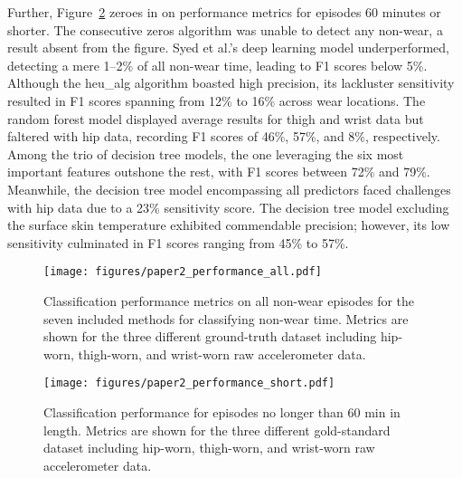 \documentclass[
  10pt,
]{scrbook}
\begin{document}
Further, Figure~\ref{fig-paper2_performance_short} zeroes in on
performance metrics for episodes 60 minutes or shorter. The consecutive
zeros algorithm was unable to detect any non-wear, a result absent from
the figure. Syed et al.'s deep learning model underperformed, detecting
a mere 1--2\% of all non-wear time, leading to F1 scores below 5\%.
Although the heu\_alg algorithm boasted high precision, its lackluster
sensitivity resulted in F1 scores spanning from 12\% to 16\% across wear
locations. The random forest model displayed average results for thigh
and wrist data but faltered with hip data, recording F1 scores of 46\%,
57\%, and 8\%, respectively. Among the trio of decision tree models, the
one leveraging the six most important features outshone the rest, with
F1 scores between 72\% and 79\%. Meanwhile, the decision tree model
encompassing all predictors faced challenges with hip data due to a 23\%
sensitivity score. The decision tree model excluding the surface skin
temperature exhibited commendable precision; however, its low
sensitivity culminated in F1 scores ranging from 45\% to 57\%.

\begin{figure}

{\centering \texttt{[image: figures/paper2\_performance\_all.pdf]}

}

\caption{\label{fig-paper2_performance_all}Classification performance
metrics on all non-wear episodes for the seven included methods for
classifying non-wear time. Metrics are shown for the three different
ground-truth dataset including hip-worn, thigh-worn, and wrist-worn raw
accelerometer data.}

\end{figure}

\begin{figure}

{\centering \texttt{[image: figures/paper2\_performance\_short.pdf]}

}

\caption{\label{fig-paper2_performance_short}Classification performance
for episodes no longer than 60 min in length. Metrics are shown for the
three different gold-standard dataset including hip-worn, thigh-worn,
and wrist-worn raw accelerometer data.}

\end{figure}
\end{document}
